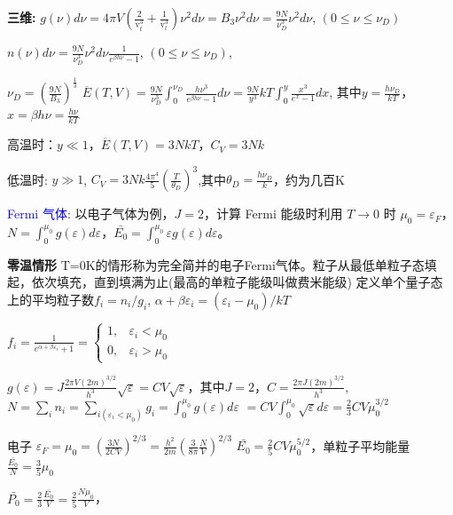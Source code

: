 \documentclass[a4paper,8pt]{extarticle} %
\newcommand{\bluetext}[1]{\textcolor{blue}{#1}}
\newcommand{\greentext}[1]{\textcolor{green}{#1}}
\begin{document}
\begin{multicols}{3}
\textbf{三维:}
$g(\nu)d\nu = 4\pi V(\frac{2}{\mathrm{v}_t^3} + \frac{1}{\mathrm{v}_l^3})\nu^2d\nu = B_3\nu^2d\nu = \frac{9N}{\nu_D^3}\nu^2d\nu$, $(0 \leq \nu \leq \nu_D)$

$n(\nu)d\nu = \frac{9N}{\nu_D^3}\nu^2d\nu\frac{1}{e^{\beta h\nu}-1}$, $(0 \leq \nu \leq \nu_D)$, 

$\nu_D = (\frac{9N}{B_3})^{\frac{1}{3}}$
$\overline{E}(T,V) = \frac{9N}{\nu_D^3}\int_0^{\nu_D}\frac{h\nu^3}{e^{\beta h\nu}-1}d\nu = \frac{9N}{y^3}kT\int_0^y\frac{x^3}{e^x-1}dx$, 
其中$y = \frac{h\nu_D}{kT}$，$x = \beta h\nu =\frac{h\nu}{kT}$

高温时：$y \ll 1$，$\overline{E}(T,V) = 3NkT$，$C_V = 3Nk$

低温时: $y \gg 1$, $C_V = 3Nk\frac{4\pi^4}{5}(\frac{T}{\theta_D})^3$,其中$\theta_D = \frac{h\nu_D}{k}$，约为几百K

\bluetext{Fermi 气体}: 以电子气体为例，$J = 2$，计算 Fermi 能级时利用 $T \to 0$ 时 $\mu_0 = \varepsilon_F$，$N = \int_0^{\mu_0}g(\varepsilon)d\varepsilon$，$\bar{E_0} = \int_0^{\mu_0}\varepsilon g(\varepsilon)d\varepsilon$。

\textbf{零温情形}
T=0K的情形称为完全简并的电子Fermi气体。粒子从最低单粒子态填起，依次填充，直到填满为止(最高的单粒子能级叫做费米能级)
定义单个量子态上的平均粒子数$f_i=n_i/g_i$, $\alpha+\beta \varepsilon_i=(\varepsilon_i-\mu_0)/kT$

$f_i = \frac{1}{e^{\alpha+\beta\varepsilon_i}+1} = \left\{\begin{array}{ll}1, & \varepsilon_i < \mu_0\\0, & \varepsilon_i > \mu_0\end{array}\right.$

$g(\varepsilon) = J\frac{2\pi V(2m)^{3/2}}{h^3}\sqrt{\varepsilon}=CV\sqrt{\varepsilon}$，其中$J = 2$，$C = \frac{2\pi J(2m)^{3/2}}{h^3}$,
$N = \sum_i n_i = \sum_{i(\varepsilon_i<\mu_0)} g_i = \int_0^{\mu_0} g(\varepsilon)d\varepsilon$
$=CV\int_0^{\mu_0} \sqrt{\varepsilon}d\varepsilon = \frac{2}{3}CV\mu_0^{3/2}$

电子 $\varepsilon_F = \mu_0 = (\frac{3N}{2CV})^{2/3} = \frac{h^2}{2m}(\frac{3}{8\pi}\frac{N}{V})^{2/3}$
$\bar{E_0} = \frac{2}{5}CV\mu_0^{5/2}$，单粒子平均能量$\frac{\bar{E_0}}{N} = \frac{3}{5}\mu_0$

$\bar{P_0} = \frac{2}{3}\frac{\bar{E_0}}{V} = \frac{2}{5}\frac{N\mu_0}{V}$，



\end{multicols}
\end{document}
